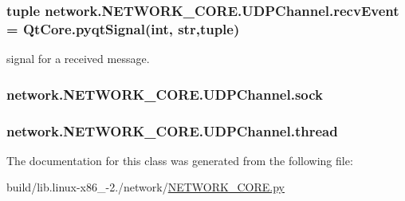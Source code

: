 \subsubsection[{recv\+Event}]{\setlength{\rightskip}{0pt plus 5cm}tuple network.\+N\+E\+T\+W\+O\+R\+K\+\_\+\+C\+O\+R\+E.\+U\+D\+P\+Channel.\+recv\+Event = Qt\+Core.\+pyqt\+Signal(int, str,tuple)\hspace{0.3cm}{\ttfamily [static]}}\label{classnetwork_1_1NETWORK__CORE_1_1UDPChannel_aafe450b69fd43efc0912db494a042b42}


signal for a received message. 

\hypertarget{classnetwork_1_1NETWORK__CORE_1_1UDPChannel_aea64337d89b2d361b8631e0c54316567}{}
\subsubsection[{sock}]{\setlength{\rightskip}{0pt plus 5cm}network.\+N\+E\+T\+W\+O\+R\+K\+\_\+\+C\+O\+R\+E.\+U\+D\+P\+Channel.\+sock}\label{classnetwork_1_1NETWORK__CORE_1_1UDPChannel_aea64337d89b2d361b8631e0c54316567}
\hypertarget{classnetwork_1_1NETWORK__CORE_1_1UDPChannel_a8cead572d015248b58dafbcb0e7f4043}{}
\subsubsection[{thread}]{\setlength{\rightskip}{0pt plus 5cm}network.\+N\+E\+T\+W\+O\+R\+K\+\_\+\+C\+O\+R\+E.\+U\+D\+P\+Channel.\+thread}\label{classnetwork_1_1NETWORK__CORE_1_1UDPChannel_a8cead572d015248b58dafbcb0e7f4043}


The documentation for this class was generated from the following file\+:\begin{DoxyCompactItemize}
\item 
build/lib.\+linux-\/x86\+\_-\/2./network/\hyperlink{build_2lib_8linux-x86__64-2_87_2network_2NETWORK__CORE_8py}{N\+E\+T\+W\+O\+R\+K\+\_\+\+C\+O\+R\+E.\+py}\end{DoxyCompactItemize}

